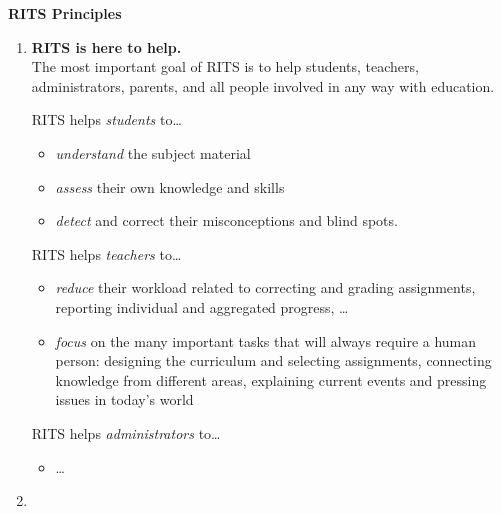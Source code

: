 \documentclass[a4paper,11pt]{article}
\begin{document}
\noindent
\begin{center}
\Large\textbf{RITS Principles}
\end{center}

\vspace{1cm}

\begin{enumerate}
\item \textbf{RITS is here to help.}\\
  The most important goal of RITS is to help students, teachers,
  administrators, parents, and all people involved in any way with
  education.

  \bigskip\noindent
  RITS helps \textit{students} to\dots
  \begin{itemize}
  \item \textit{understand} the subject material
  \item \textit{assess} their own knowledge and skills
  \item \textit{detect} and correct their misconceptions and blind spots.
  \end{itemize}

  \bigskip\noindent
  RITS helps \textit{teachers} to\dots
  \begin{itemize}
  \item \textit{reduce} their workload related to correcting and grading
    assignments, reporting individual and aggregated progress, \dots
  \item \textit{focus} on the many important tasks that will always require a
    human person: designing the curriculum and selecting assignments,
    connecting knowledge from different areas, explaining current
    events and pressing issues in today's world
  \end{itemize}
  \bigskip\noindent
    
    RITS helps \textit{administrators} to\dots
    \begin{itemize}
    \item \dots
    \end{itemize}
  \item
  \end{enumerate}

\vfil
\end{document}
